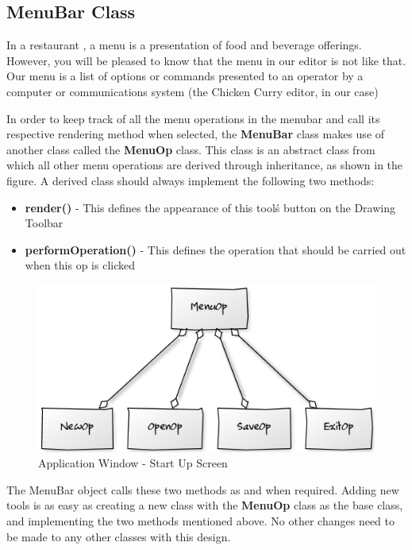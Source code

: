 \documentclass[12pt]{report}
\begin{document}
\subsection{MenuBar Class}
In a restaurant , a menu is a presentation of food and beverage offerings. However, you will be pleased to know that the menu in our editor is not like that. Our menu is a list of options or commands presented to an operator by a computer or communications system (the Chicken Curry editor, in our case)



In order to keep track of all the menu operations in the menubar and call its respective rendering method when selected, the \textbf{MenuBar} class makes use of another class called the \textbf{MenuOp} class. This class is an abstract class from which all other menu operations are derived through inheritance, as shown in the figure. A derived class should always implement the following two methods:
\begin{itemize}
\item{}\textbf{render() }- This defines the appearance of this tool\' s button on the Drawing Toolbar
\item{}\textbf{performOperation()} - This defines the operation that should be carried out when this op is clicked
\end{itemize}

\begin{figure}[h!]
\centering
  \includegraphics[scale=0.5]{menuop.png}
\caption{Application Window - Start Up Screen}
\end{figure}


The MenuBar object calls these two methods as and when required. Adding new tools is as easy as creating a new class with the \textbf{MenuOp} class as the base class, and implementing the two methods mentioned above. No other changes need to be made to any other classes with this design.
\end{document}
